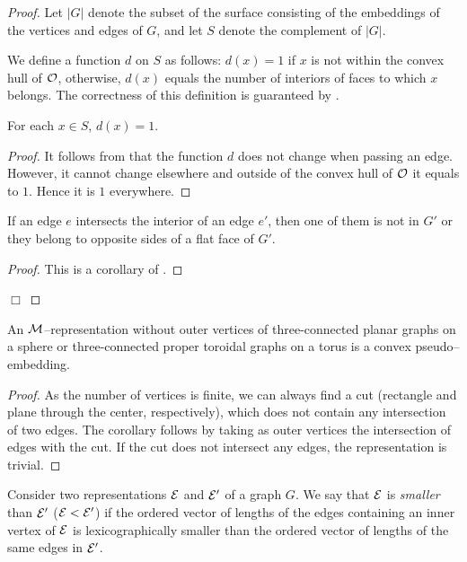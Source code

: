 \documentclass[invmat]{svjour}
\begin{document}
\begin{proof}
Let $|G|$ denote the subset of the surface consisting of the embeddings of
the vertices and edges of $G$, and let $S$ denote the complement of $|G|$.

We define a function $d$ on $S$ as follows: $d(x)=1$ if $x$ is not within
the convex hull of $\mathcal{O}$, otherwise, $d(x)$ equals the number of
interiors of faces to which $x$ belongs. The correctness of this definition
is guaranteed by .

\begin{lemma}
\label{l:d_equals_1}
For each $x\in S$, $d(x)=1$.
\end{lemma}
\begin{proof}
It follows from  that the function $d$ does not change when
passing an edge. However, it cannot change elsewhere and outside of
the convex hull of $\mathcal{O}$ it equals to $1$. Hence it is $1$ everywhere.
\end{proof}

\begin{lemma}
\label{l:edge_interior}
If an edge $e$ intersects the interior of an edge $e'$, then one of
them is not in $G'$ or they belong to opposite sides of a flat face of $G'$.
\end{lemma}
\begin{proof}
This is a corollary of .
\end{proof}
$\Box$
\end{proof}

\begin{corollary}
\label{c:m_representations_pseudo}
An $\mathcal{M}$--representation without outer vertices of three-connected planar
graphs on a sphere or three-connected proper toroidal graphs on a torus
is a convex pseudo--embedding.
\end{corollary}

\begin{proof}
As the number of vertices is finite, we can always find a cut (rectangle
and plane through the center, respectively), which does not contain any
intersection of two edges. The corollary follows by taking as outer
vertices the intersection of edges with the cut. If the cut does not
intersect any edges, the representation is trivial.
\end{proof}

\begin{definition}
\label{d:ordering}
Consider two representations $\mathcal{E}$ and $\mathcal{E}'$ of a graph $G$.
We say that $\mathcal{E}$ is \emph{smaller} than $\mathcal{E}'$ ($\mathcal{E} < \mathcal{E}'$)
if the ordered vector of lengths of the edges containing an inner vertex
of $\mathcal{E}$ is lexicographically smaller than the ordered vector of
lengths of the same edges in $\mathcal{E}'$.
\end{definition}
\end{document}
